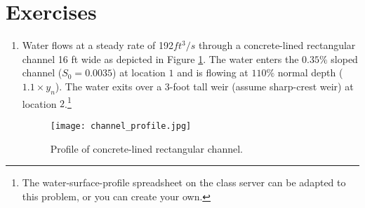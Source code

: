 \documentclass[12pt]{article}
\begin{document}
\section*{\small{Exercises}}
\begin{enumerate}
\item Water flows at a steady rate of 192$ft^3/s$ through a concrete-lined rectangular channel 16 ft wide as depicted in Figure \ref{fig:channel_profile}. The water enters the $0.35 \%$ sloped channel ($S_0 = 0.0035$) at location $1$ and is flowing at $110\%$ normal depth ($1.1 \times y_n$).  The water exits over a 3-foot tall weir (assume sharp-crest weir) at location $2$.\footnote{The water-surface-profile spreadsheet on the class server can be adapted to this problem, or you can create your own.}

\begin{figure}[htbp] %
   \centering
   \texttt{[image: channel\_profile.jpg]} 
   \caption{Profile of concrete-lined rectangular channel.}
   \label{fig:channel_profile}
\end{figure}


\end{enumerate}
\end{document}
